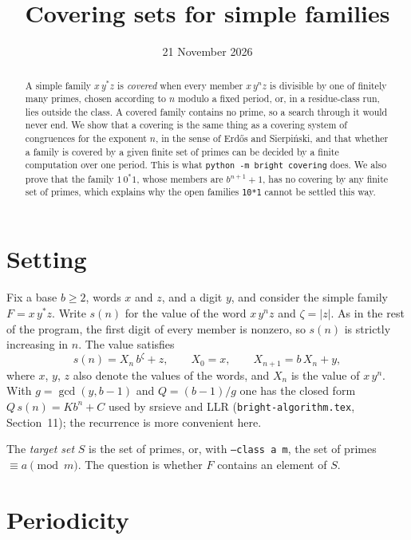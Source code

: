 \documentclass[11pt]{article}
\title{Covering sets for simple families}
\author{}  %
\date{21 November 2026}
\theoremstyle{definition}
\theoremstyle{remark}
\newcommand{\code}[1]{\texttt{#1}}
\begin{document}
\maketitle

\begin{abstract}
A simple family $x\,y^*z$ is \emph{covered} when every member $x\,y^n z$ is divisible by one of finitely many primes, chosen according to $n$ modulo a fixed period, or, in a residue-class run, lies outside the class. A covered family contains no prime, so a search through it would never end. We show that a covering is the same thing as a covering system of congruences for the exponent $n$, in the sense of Erd\H{o}s and Sierpi\'nski, and that whether a family is covered by a given finite set of primes can be decided by a finite computation over one period. This is what \code{python -m bright covering} does. We also prove that the family $1\,0^*1$, whose members are $b^{n+1}+1$, has no covering by any finite set of primes, which explains why the open families \code{10*1} cannot be settled this way.
\end{abstract}

\section{Setting}

Fix a base $b\ge 2$, words $x$ and $z$, and a digit $y$, and consider the simple family $F=x\,y^*z$. Write $s(n)$ for the value of the word $x\,y^nz$ and $\zeta=|z|$. As in the rest of the program, the first digit of every member is nonzero, so $s(n)$ is strictly increasing in $n$. The value satisfies
\[
  s(n)=X_n\,b^{\zeta}+z,\qquad X_0=x,\qquad X_{n+1}=b\,X_n+y,
\]
where $x$, $y$, $z$ also denote the values of the words, and $X_n$ is the value of $x\,y^n$. With $g=\gcd(y,b-1)$ and $Q=(b-1)/g$ one has the closed form $Q\,s(n)=K b^n+C$ used by srsieve and LLR (\code{bright-algorithm.tex}, Section~11); the recurrence is more convenient here.

The \emph{target set} $S$ is the set of primes, or, with \code{--class a m}, the set of primes $\equiv a\pmod m$. The question is whether $F$ contains an element of $S$.

\section{Periodicity}
\end{document}
